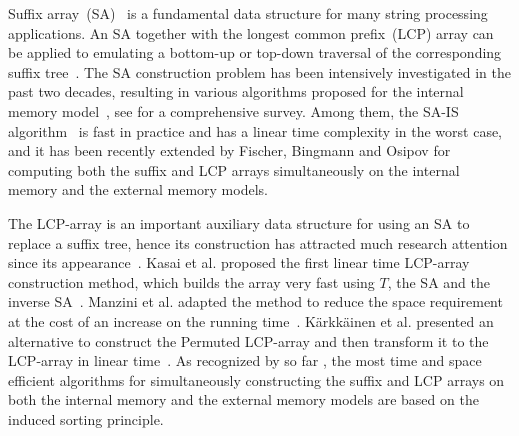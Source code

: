 \documentclass{llncs}
\begin{document}
Suffix array~(SA)~\cite{Manber1993} is a fundamental data structure for many string processing applications. An SA together with the longest common prefix~(LCP) array can be applied to emulating a bottom-up or top-down traversal of the corresponding suffix tree~\cite{Abouelhodaa2004}. The SA construction problem has been intensively investigated in the past two decades, resulting in various algorithms proposed for the internal memory model~\cite{Burkhardt2003,Manzini2004,Schurmann2007, Ko2003, Kim2004, Karkkainen2003,nong2011}, see \cite{Puglisi2007} for a comprehensive survey. Among them, the SA-IS algorithm~\cite{nong2011} is fast in practice and has a linear time complexity in the worst case, and it has been recently extended by Fischer, Bingmann and Osipov \cite{Fischer11,Bingmann12} for computing both the suffix and LCP arrays simultaneously on the internal memory and the external memory models.

The LCP-array is an important auxiliary data structure for using an SA to replace a suffix tree, hence its construction has attracted much research attention since its appearance~\cite{Manber1993}. Kasai et al. proposed the first linear time LCP-array construction method, which builds the array very fast using $T$, the SA and the inverse SA~\cite{Kasai2001}. Manzini et al. adapted the method to reduce the space requirement at the cost of an increase on the running time~\cite{Manzini2004-2}. K\"{a}rkk\"{a}inen et al. presented an alternative to construct the Permuted LCP-array and then transform it to the LCP-array in linear time~\cite{Karkkainen2009}. As recognized by so far \cite{Fischer11,Bingmann12}, the most time and space efficient algorithms for simultaneously constructing the suffix and LCP arrays on both the internal memory and the external memory models are based on the induced sorting principle.
\end{document}
